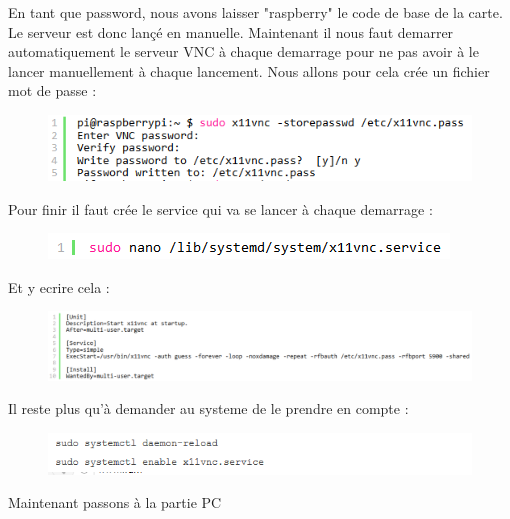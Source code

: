 \documentclass[a4paper,11pt]{report}
\begin{document}
			\newline En tant que password, nous avons laisser "raspberry" le code de base de la carte. Le serveur est donc lançé en manuelle.
			\newline \newline Maintenant il nous faut demarrer automatiquement le serveur VNC à chaque demarrage pour ne pas avoir à le lancer manuellement à chaque lancement. Nous allons pour cela crée un fichier mot de passe :
			\begin{figure}[!h]
				\begin{center}
					\includegraphics{Illustrations/7.png}
				\end{center}
			\end{figure}
			\newline Pour finir il faut crée le service qui va se lancer à chaque demarrage :
			\begin{figure}[!h]
				\begin{center}
					\includegraphics{Illustrations/8.png}
				\end{center}
			\end{figure}
			\newline Et y ecrire cela :
			\begin{figure}[!h]
				\begin{center}
					\includegraphics[scale=0.5]{Illustrations/9.png}
				\end{center}
			\end{figure}
			\newline Il reste plus qu'à demander au systeme de le prendre en compte :
			\begin{figure}[!h]
				\begin{center}
					\includegraphics{Illustrations/10.png}
				\end{center}
			\end{figure}
			\newline Maintenant passons à la partie PC \newpage
			
\end{document}
